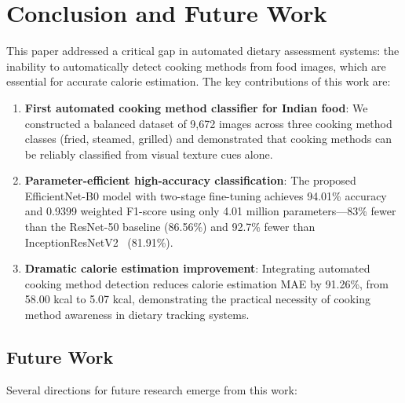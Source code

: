 \documentclass[journal]{IEEEtran}
\begin{document}
\section{Conclusion and Future Work}

This paper addressed a critical gap in automated dietary assessment systems: the inability to automatically detect cooking methods from food images, which are essential for accurate calorie estimation. The key contributions of this work are:

\begin{enumerate}
    \item \textbf{First automated cooking method classifier for Indian food}: We constructed a balanced dataset of 9,672 images across three cooking method classes (fried, steamed, grilled) and demonstrated that cooking methods can be reliably classified from visual texture cues alone.
    \item \textbf{Parameter-efficient high-accuracy classification}: The proposed EfficientNet-B0 model with two-stage fine-tuning achieves 94.01\% accuracy and 0.9399 weighted F1-score using only 4.01 million parameters---83\% fewer than the ResNet-50 baseline (86.56\%) and 92.7\% fewer than InceptionResNetV2~\cite{chun2022korean} (81.91\%).
    \item \textbf{Dramatic calorie estimation improvement}: Integrating automated cooking method detection reduces calorie estimation MAE by 91.26\%, from 58.00 kcal to 5.07 kcal, demonstrating the practical necessity of cooking method awareness in dietary tracking systems.
\end{enumerate}

\subsection{Future Work}

Several directions for future research emerge from this work:
\end{document}
